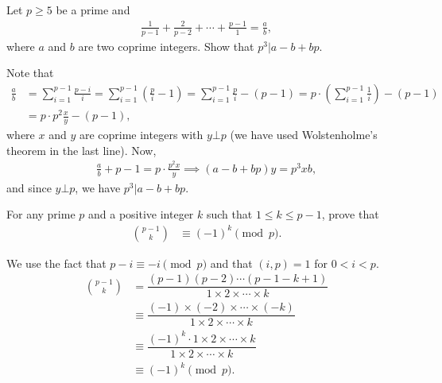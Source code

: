 \documentclass[12pt]{subfile}
\begin{document}
		\begin{problem}
			Let $p \geq 5$ be a prime and
			\begin{align*}
			\frac{1}{p-1} + \frac{2}{p-2} + \cdots + \frac{p-1}{1}=\frac{a}{b},
			\end{align*}
			where $a$ and $b$ are two coprime integers. Show that $p^3 | a-b+bp$.
		\end{problem}
		
		\begin{solution}
			Note that
				\begin{align*}
					\frac{a}{b} &= \sum_{i=1}^{p-1} \frac{p-i}{i} =\sum_{i=1}^{p-1} \left(\frac{p}{i} -1 \right)=\sum_{i=1}^{p-1} \frac{p}{i} - (p-1) =p\cdot\left(\sum_{i=1}^{p-1} \frac{1}{i}\right) - (p-1)\\
					&=p \cdot p^2 \frac{x}{y} - (p-1),
				\end{align*}
			where $x$ and $y$ are coprime integers with $y \bot p$ (we have used Wolstenholme's theorem in the last line). Now,
				\begin{align*}
					\frac a b+p-1=p\cdot\frac{p^2x}y \implies (a-b+bp)y=p^3xb,
				\end{align*}
			and since $y\bot p$, we have $p^3 | a-b+bp$.
			
		\end{solution}
	


		\begin{problem}\label{prob:binom(p-1)(k)}
			For any prime $p$ and a positive integer $k$ such that $1 \leq k \leq p-1$, prove that
				\begin{align*}
					\binom{p-1}{k} & \equiv(-1)^k\pmod p.
				\end{align*}
		\end{problem}
		
		\begin{solution}
			We use the fact that $p-i\equiv-i\pmod p$ and that $(i,p)=1$ for $0<i<p$.
				\begin{align*}
					\binom{p-1}{k} & = \dfrac{(p-1)(p-2)\cdots(p-1-k+1)}{1\times 2 \times \cdots \times k}\\
					& \equiv \dfrac{(-1) \times (-2) \times \cdots \times (-k)}{1\times 2 \times \cdots \times k}\\
					& \equiv\dfrac{(-1)^k \cdot 1\times 2 \times \cdots \times k}{1\times 2 \times \cdots \times k}\\
					& \equiv(-1)^k\pmod p.
				\end{align*}
			
		\end{solution}
			
\end{document}
